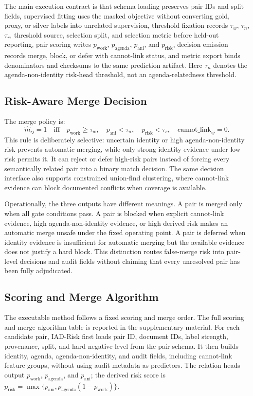 \documentclass[11pt]{article}
\begin{document}
The main execution contract is that schema loading preserves pair IDs and split fields, supervised fitting uses the masked objective without converting gold, proxy, or silver labels into unrelated supervision, threshold fixation records $\tau_w$, $\tau_n$, $\tau_r$, threshold source, selection split, and selection metric before held-out reporting, pair scoring writes $p_{\mathrm{work}}$, $p_{\mathrm{agenda}}$, $p_{\mathrm{ani}}$, and $p_{\mathrm{risk}}$, decision emission records merge, block, or defer with cannot-link status, and metric export binds denominators and checksums to the same prediction artifact. Here $\tau_n$ denotes the agenda-non-identity risk-head threshold, not an agenda-relatedness threshold.

\subsection{Risk-Aware Merge Decision}

The merge policy is:
\[
\hat{m}_{ij}=1 \quad \mathrm{iff}\quad
p_{\mathrm{work}}\geq \tau_w,\quad
p_{\mathrm{ani}}<\tau_n,\quad
p_{\mathrm{risk}}<\tau_r,\quad
\mathrm{cannot\_link}_{ij}=0.
\]
This rule is deliberately selective: uncertain identity or high agenda-non-identity risk prevents automatic merging, while only strong identity evidence under low risk permits it. It can reject or defer high-risk pairs instead of forcing every semantically related pair into a binary match decision. The same decision interface also supports constrained union-find clustering, where cannot-link evidence can block documented conflicts when coverage is available.

Operationally, the three outputs have different meanings. A pair is merged only when all gate conditions pass. A pair is blocked when explicit cannot-link evidence, high agenda-non-identity evidence, or high derived risk makes an automatic merge unsafe under the fixed operating point. A pair is deferred when identity evidence is insufficient for automatic merging but the available evidence does not justify a hard block. This distinction routes false-merge risk into pair-level decisions and audit fields without claiming that every unresolved pair has been fully adjudicated.

\subsection{Scoring and Merge Algorithm}

The executable method follows a fixed scoring and merge order. The full scoring and merge algorithm table is reported in the supplementary material. For each candidate pair, IAD-Risk first loads pair ID, document IDs, label strength, provenance, split, and hard-negative level from the pair schema. It then builds identity, agenda, agenda-non-identity, and audit fields, including cannot-link feature groups, without using audit metadata as predictors. The relation heads output $p_{\mathrm{work}}$, $p_{\mathrm{agenda}}$, and $p_{\mathrm{ani}}$; the derived risk score is $p_{\mathrm{risk}}=\max\{p_{\mathrm{ani}},p_{\mathrm{agenda}}(1-p_{\mathrm{work}})\}$.
\end{document}
